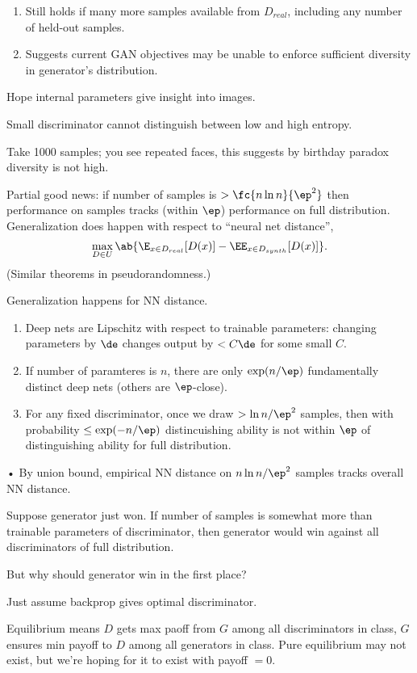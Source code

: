 \begin{enumerate}
\item
Still holds if many more samples available from $D_{real}$, including any number of held-out samples.
\item
Suggests current GAN objectives may be unable to enforce sufficient diversity in generator's distribution.
\end{enumerate}

Hope internal parameters give insight into images. 

Small discriminator cannot distinguish between low and high entropy.

Take 1000 samples; you see repeated faces, this suggests by birthday paradox diversity is not high.

Partial good news: if number of samples is $>\fc{n\ln n}{\ep^2}$ then performance on samples tracks (within $\ep$) performance on full distribution. Generalization does happen with respect to ``neural net distance'',
$$
\max_{D\in U} \ab{\E_{x\in D_{real}}[D(x)] - \EE_{x\in D_{synth}}[D(x)]}.
$$
(Similar theorems in pseudorandomness.)

Generalization happens for NN distance. 
\begin{enumerate}
\item
Deep nets are Lipschitz with respect to trainable parameters: changing parameters by $\de$ changes output by $<C\de$ for some small $C$.
\item
If number of paramteres is $n$, there are only $\exp(n/\ep)$ fundamentally distinct deep nets (others are $\ep$-close).
\item
For any fixed discriminator, once we draw $>\ln n/\ep^2$ samples, then with probability $\le \exp(-n/\ep)$ distincuishing ability is not within $\ep$ of distinguishing ability for full distribution.
\end{enumerate}•
By union bound, empirical NN distance on $n\ln n/\ep^2$ samples tracks overall NN distance.

Suppose generator just won. If number of samples is somewhat more than trainable parameters of discriminator, then generator would win against all discriminators of full distribution.

But why should generator win in the first place?

Just assume backprop gives optimal discriminator.

Equilibrium means $D$ gets max paoff from $G$ among all discriminators in class, $G$ ensures min payoff to $D$ among all generators in class. Pure equilibrium may not exist, but we're hoping for it to exist with payoff $=0$.

